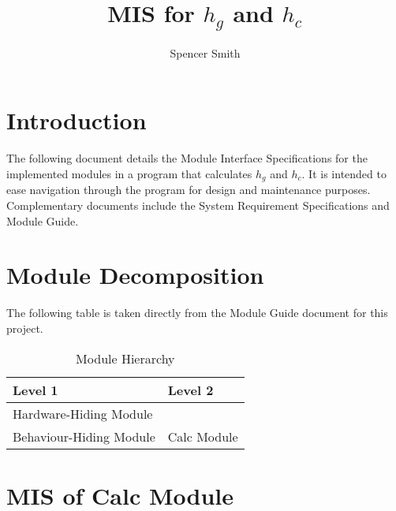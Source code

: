 \documentclass{article}
\title{MIS for $h_g$ and $h_c$}
\author{Spencer Smith}
\begin{document}
\maketitle

\section*{Introduction}
The following document details the Module Interface Specifications for the implemented
modules in a program that calculates $h_g$ and $h_c$.
 It is intended to ease navigation through the program for design and maintenance purposes.  Complementary documents include the System Requirement Specifications and Module Guide.

\section{Module Decomposition}
The following table is taken directly from the Module Guide document for this project.
\begin{table}[h!]
\centering
\begin{tabular}{p{} p{}}
\toprule
\textbf{Level 1} & \textbf{Level 2}\\
\midrule

{Hardware-Hiding Module} & ~ \\
\midrule

{Behaviour-Hiding Module} & Calc Module\\
\bottomrule

\end{tabular}
\caption{Module Hierarchy}
\label{TblMH}
\end{table}

\section*{MIS of Calc Module}




\end{document}
